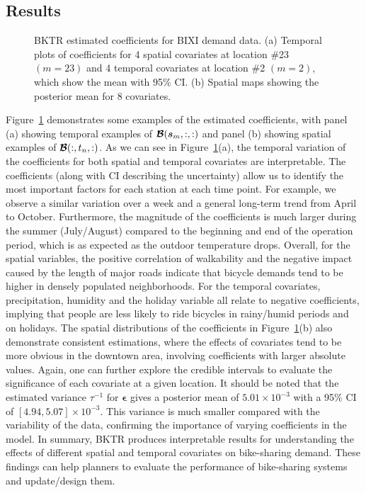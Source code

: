 \documentclass[12pt]{article}
\newcommand{\bd}[1]{\boldsymbol{#1}}
\begin{document}
\subsection{Results}



\begin{figure}[!t]
\centering
{}
\caption{{BKTR estimated coefficients for BIXI demand data. (a) Temporal plots of coefficients for 4 spatial covariates at location \#23 $(m=23)$ and 4 temporal covariates at location \#2 $(m=2)$, which show the mean with 95\% CI. (b) Spatial maps showing the posterior mean for 8 covariates.}}
\label{Fig:BIXI_Coe}
\end{figure}



Figure~\ref{Fig:BIXI_Coe} demonstrates some examples of the estimated coefficients, with panel (a) showing temporal examples of $\bd{\cal{B}}(\bd{s}_{m},:,:)$ and panel (b) showing spatial examples of $\bd{\cal{B}}(:,t_{n},:)$. As we can see in Figure~\ref{Fig:BIXI_Coe}(a), the temporal variation of the coefficients for both spatial and temporal covariates are interpretable. The coefficients (along with CI describing the uncertainty) allow us to identify the most important factors for each station at each time point. For example, we observe a similar variation over a week and a general long-term trend from April to October. Furthermore, the magnitude of the coefficients is much larger during the summer (July/August) compared to the beginning and end of the operation period, which is as expected as the outdoor temperature drops. Overall, for the spatial variables, the positive correlation of walkability and the negative impact caused by the length of major roads indicate that bicycle demands tend to be higher in densely populated neighborhoods. For the temporal covariates, precipitation, humidity and the holiday variable all relate to negative coefficients, implying that people are less likely to ride bicycles in rainy/humid periods and on holidays. The spatial distributions of the coefficients in Figure~\ref{Fig:BIXI_Coe}(b) also demonstrate consistent estimations, where the effects of covariates tend to be more obvious in the downtown area, involving coefficients with larger absolute values. Again, one can further explore the credible intervals to evaluate the significance of each covariate at a given location. It should be noted that the estimated variance $\tau^{-1}$ for $\boldsymbol{\epsilon}$ gives a posterior mean of $5.01\times 10^{-3}$ with a 95\% CI of $[4.94, 5.07]\times 10^{-3}$. This variance is much smaller compared with the variability of the data, confirming the importance of varying coefficients in the model. In summary, BKTR produces interpretable results for understanding the effects of different spatial and temporal covariates on bike-sharing demand. These findings can help planners to evaluate the performance of bike-sharing systems and update/design them. 
\end{document}
